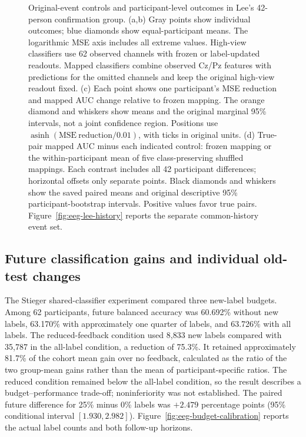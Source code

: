 \documentclass[11pt,a4paper]{article}
\begin{document}
\begin{figure}[p]
\caption{Original-event controls and participant-level outcomes in Lee's 42-person confirmation group. (a,b) Gray points show individual outcomes; blue diamonds show equal-participant means. The logarithmic MSE axis includes all extreme values. High-view classifiers use 62 observed channels with frozen or label-updated readouts. Mapped classifiers combine observed Cz/Pz features with predictions for the omitted channels and keep the original high-view readout fixed. (c) Each point shows one participant's MSE reduction and mapped AUC change relative to frozen mapping. The orange diamond and whiskers show means and the original marginal 95\% intervals, not a joint confidence region. Positions use $\operatorname{asinh}(\mathrm{MSE\ reduction}/0.01)$, with ticks in original units. (d) True-pair mapped AUC minus each indicated control: frozen mapping or the within-participant mean of five class-preserving shuffled mappings. Each contrast includes all 42 participant differences; horizontal offsets only separate points. Black diamonds and whiskers show the saved paired means and original descriptive 95\% participant-bootstrap intervals. Positive values favor true pairs. Figure~\ref{fig:eeg-lee-history} reports the separate common-history event set.}
\label{fig:eeg-lee-endpoints}
\end{figure}

\subsection{Future classification gains and individual old-test changes}
\label{sec:retention}

The Stieger shared-classifier experiment compared three new-label budgets. Among 62 participants, future balanced accuracy was 60.692\% without new labels, 63.170\% with approximately one quarter of labels, and 63.726\% with all labels. The reduced-feedback condition used 8,833 new labels compared with 35,787 in the all-label condition, a reduction of 75.3\%. It retained approximately 81.7\% of the cohort mean gain over no feedback, calculated as the ratio of the two group-mean gains rather than the mean of participant-specific ratios. The reduced condition remained below the all-label condition, so the result describes a budget--performance trade-off; noninferiority was not established. The paired future difference for 25\% minus 0\% labels was $+2.479$ percentage points (95\% conditional interval $[1.930,2.982]$). Figure~\ref{fig:eeg-budget-calibration} reports the actual label counts and both follow-up horizons.
\end{document}
